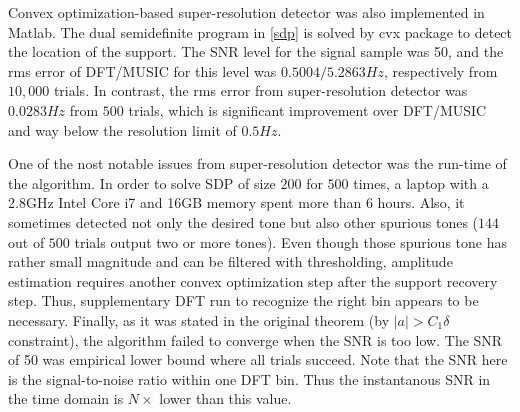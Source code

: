 \documentclass[11pt,journal, onecolumn]{IEEEtran}
\theoremstyle{theorem}
\begin{document}
Convex optimization-based super-resolution detector was also implemented in Matlab. The dual semidefinite program in \eqref{sdp} is solved by \textsf{cvx} package \cite{cvx} to detect the location of the support. The SNR level for the signal sample was 50, and the rms error of DFT/MUSIC for this level was $0.5004/5.2863Hz$, respectively from $10,000$ trials. In contrast, the rms error from super-resolution detector was $0.0283Hz$ from $500$ trials, which is significant improvement over DFT/MUSIC and way below the resolution limit of $0.5Hz$. 

One of the nost notable issues from super-resolution detector was the run-time of the algorithm. In order to solve SDP of size $200$ for $500$ times, a laptop with a 2.8GHz Intel Core i7 and 16GB memory spent more than 6 hours. Also, it sometimes detected not only the desired tone but also other spurious tones ($144$ out of $500$ trials output two or more tones). Even though those spurious tone has rather small magnitude and can be filtered with thresholding, amplitude estimation requires another convex optimization step after the support recovery step. Thus, supplementary DFT run to recognize the right bin appears to be necessary. Finally, as it was stated in the original theorem (by $|a|>C_1\delta$ constraint), the algorithm failed to converge when the SNR is too low. The SNR of 50 was empirical lower bound where all trials succeed. Note that the SNR here is the signal-to-noise ratio within one DFT bin. Thus the instantanous SNR in the time domain is $N\times$ lower than this value.



\end{document}
